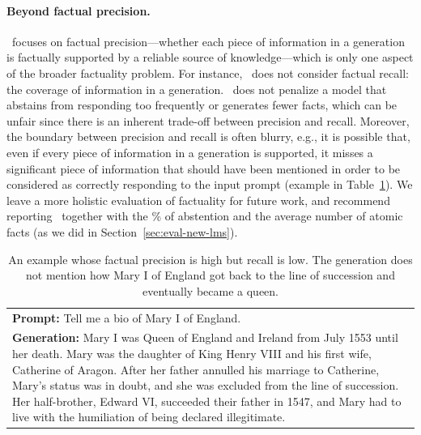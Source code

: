 \paragraph{Beyond factual precision.}
\ours\ focuses on factual precision---whether each piece of information in a generation is factually supported by a reliable source of knowledge---which is only one aspect of the broader factuality problem.
For instance, \ours\ does not consider factual recall: the coverage of information in a generation.
\ours\ does not penalize a model that abstains from responding too frequently or generates fewer facts, which can be unfair since there is an inherent trade-off between precision and recall.
Moreover, the boundary between precision and recall is often blurry, e.g., it is possible that, even if every piece of information in a generation is supported, it misses a significant piece of information that should have been mentioned in order to be considered as correctly responding to the input prompt (example in Table~\ref{tab:recall}).
We leave a more holistic evaluation of factuality for future work, and recommend reporting \ours\ together with the \% of abstention and the average number of atomic facts (as we did in Section~\ref{sec:eval-new-lms}).

\begin{table}[t]
    \center \footnotesize
    \begin{tabular}{p{7.3cm}}
        \toprule        
           \textbf{Prompt:} Tell me a bio of Mary I of England. \\
           \textbf{Generation:}
           Mary I %
           was Queen of England and Ireland from July 1553 until her death. Mary was the daughter of King Henry VIII and his first wife, Catherine of Aragon. After her father annulled his marriage to Catherine, Mary’s status was in doubt, and she was excluded from the line of succession. Her half-brother, Edward VI, succeeded their father in 1547, and Mary had to live with the humiliation of being declared illegitimate. \\
        \bottomrule
    \end{tabular}
    \caption{An example whose factual precision is high but recall is low. The generation does not mention how Mary I of England got back to the line of succession and eventually became a queen. %
    \vspace{-.5em}
    }\label{tab:recall}
\end{table}

